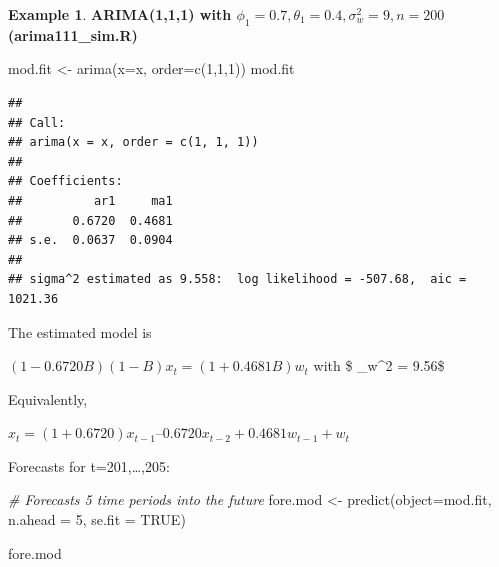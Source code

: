 \documentclass[
]{book}
\newenvironment{Shaded}{\begin{snugshade}}{\end{snugshade}}
\newcommand{\AttributeTok}[1]{\textcolor[rgb]{0.77,0.63,0.00}{#1}}
\newcommand{\CommentTok}[1]{\textcolor[rgb]{0.56,0.35,0.01}{\textit{#1}}}
\newcommand{\ConstantTok}[1]{\textcolor[rgb]{0.00,0.00,0.00}{#1}}
\newcommand{\DecValTok}[1]{\textcolor[rgb]{0.00,0.00,0.81}{#1}}
\newcommand{\FunctionTok}[1]{\textcolor[rgb]{0.00,0.00,0.00}{#1}}
\newcommand{\NormalTok}[1]{#1}
\newcommand{\OtherTok}[1]{\textcolor[rgb]{0.56,0.35,0.01}{#1}}
\newcommand{\SpecialCharTok}[1]{\textcolor[rgb]{0.00,0.00,0.00}{#1}}
\newcommand{\StringTok}[1]{\textcolor[rgb]{0.31,0.60,0.02}{#1}}
\theoremstyle{definition}
\theoremstyle{definition}
\newtheorem{example}{Example}[chapter]
\theoremstyle{definition}
\theoremstyle{definition}
\theoremstyle{remark}
\begin{document}
\begin{example}
\textbf{ARIMA(1,1,1) with \(\phi_1=0.7, \theta_1=0.4, \sigma_w^2=9, n=200\)(arima111\_sim.R)}

\begin{Shaded}
\end{Shaded}

\begin{Shaded}
\begin{Highlighting}[]
\NormalTok{mod.fit }\OtherTok{\textless{}{-}} \FunctionTok{arima}\NormalTok{(}\AttributeTok{x=}\NormalTok{x, }\AttributeTok{order=}\FunctionTok{c}\NormalTok{(}\DecValTok{1}\NormalTok{,}\DecValTok{1}\NormalTok{,}\DecValTok{1}\NormalTok{))}
\NormalTok{mod.fit}
\end{Highlighting}
\end{Shaded}

\begin{verbatim}
## 
## Call:
## arima(x = x, order = c(1, 1, 1))
## 
## Coefficients:
##          ar1     ma1
##       0.6720  0.4681
## s.e.  0.0637  0.0904
## 
## sigma^2 estimated as 9.558:  log likelihood = -507.68,  aic = 1021.36
\end{verbatim}

The estimated model is

\((1 - 0.6720B)(1 - B)x_t = (1+0.4681B)w_t\) with \$ \hat \sigma\_w\^{}2 = 9.56\$

Equivalently,

\(x_t=(1 + 0.6720)x_{t-1} – 0.6720x_{t-2} + 0.4681w_{t-1} + w_t\)

Forecasts for t=201,\ldots,205:

\begin{Shaded}
\begin{Highlighting}[]
\CommentTok{\# Forecasts 5 time periods into the future}
\NormalTok{fore.mod }\OtherTok{\textless{}{-}} \FunctionTok{predict}\NormalTok{(}\AttributeTok{object=}\NormalTok{mod.fit, }\AttributeTok{n.ahead =} \DecValTok{5}\NormalTok{, }\AttributeTok{se.fit =} \ConstantTok{TRUE}\NormalTok{)}

\NormalTok{fore.mod}
\end{Highlighting}
\end{Shaded}


\end{example}
\end{document}

